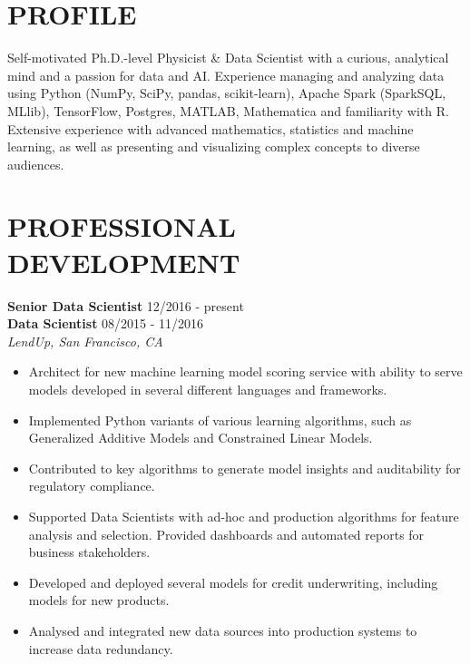 \documentclass[10pt,centered]{./res} %
\begin{document}
\vspace*{-1.5cm}
\begin{resume}
\vspace{0.4cm}

\section{\color{ResumeBlue}PROFILE}
Self-motivated Ph.D.-level Physicist \& Data Scientist with a curious, analytical mind and a passion for data and AI. Experience managing and analyzing data using Python (NumPy, SciPy, pandas, scikit-learn), Apache Spark (SparkSQL, MLlib), TensorFlow, Postgres, MATLAB, {\sc Mathematica} and familiarity with R. Extensive experience with advanced mathematics, statistics and machine learning, as well as presenting and visualizing complex concepts to diverse audiences.

\section{\color{ResumeBlue}PROFESSIONAL DEVELOPMENT}
{\bf Senior Data Scientist} \hfill12/2016 - present \\
{\bf Data Scientist} \hfill08/2015 - 11/2016 \\
{\it LendUp, San Francisco, CA}
\begin{itemize}
  \item Architect for new machine learning model scoring service with ability to serve models developed in several different languages and frameworks.
  \item Implemented Python variants of various learning algorithms, such as Generalized Additive Models and Constrained Linear Models.
  \item Contributed to key algorithms to generate model insights and auditability for regulatory compliance.
  \item Supported Data Scientists with ad-hoc and production algorithms for feature analysis and selection. Provided dashboards and automated reports for business stakeholders.
  \item Developed and deployed several models for credit underwriting, including models for new products.
  \item Analysed and integrated new data sources into production systems to increase data redundancy.
\end{itemize}


\end{resume}
\end{document}

